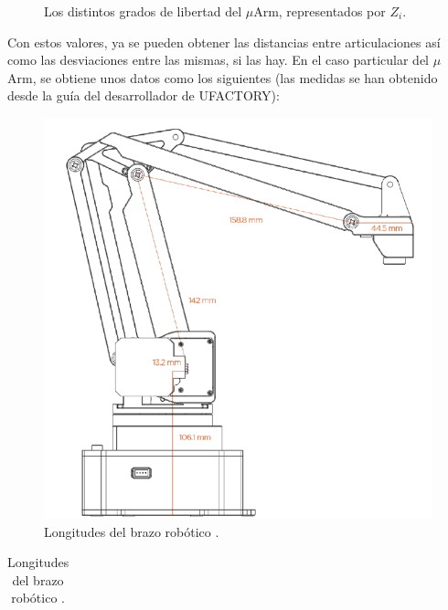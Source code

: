 \begin{figure}[H]
\begin{minipage}{.48\linewidth}
        \caption{Los distintos grados de libertad del $\mu$Arm, representados por $Z_i$.}
        \label{fig:uArm_axis}
    \end{minipage}
\end{figure}

Con estos valores, ya se pueden obtener las distancias entre articulaciones así
como las desviaciones entre las mismas, si las hay. En el caso particular del $\mu$Arm,
se obtiene unos datos como los siguientes (las medidas se han obtenido desde la guía del
desarrollador de UFACTORY\cite{ufactoryUArmSwiftPro2017}):

\begin{table}[ht]
    \begin{minipage}{.49\linewidth}
        \begin{figure}[H]
            \centering
            \includegraphics[width=\linewidth]{pictures/sizes.png}
            \caption{Longitudes del brazo robótico \cite{ufactoryUArmSwiftPro2017}.}
            \label{fig:sizes}
        \end{figure}
    \end{minipage}
    \hfill
    \begin{minipage}{.49\linewidth}
        \centering
        \begin{tabular}{|| c | c c ||}
            \hline

\end{tabular}
\end{minipage}
\end{table}
